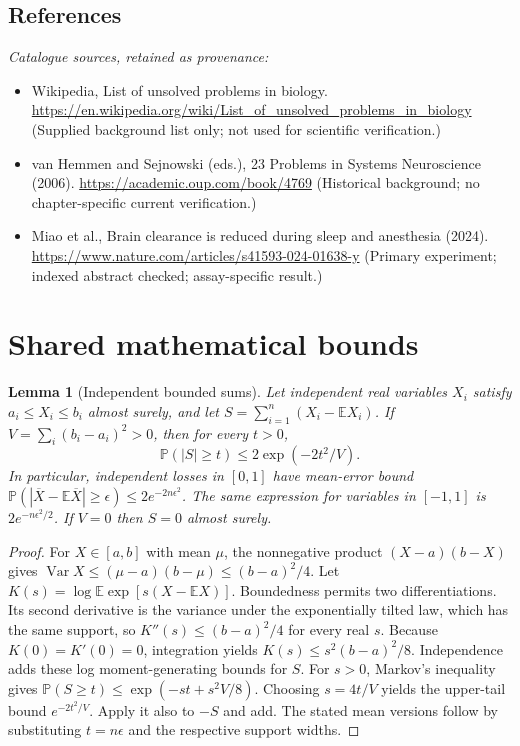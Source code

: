 \documentclass[11pt]{article}
\newcommand{\E}{\mathbb E}
\newcommand{\Prob}{\mathbb P}
\DeclareMathOperator{\Var}{Var}
\providecommand{\E}{\mathbb E}
\providecommand{\Prob}{\mathbb P}
\providecommand{\Var}{\operatorname{Var}}
\newtheorem{sharedlemma}{Lemma}[section]
\begin{document}
\subsection{References}
\noindent\emph{Catalogue sources, retained as provenance:}
\begin{itemize}
\item Wikipedia, List of unsolved problems in biology. \url{https://en.wikipedia.org/wiki/List_of_unsolved_problems_in_biology} (Supplied background list only; not used for scientific verification.)
\item van Hemmen and Sejnowski (eds.), 23 Problems in Systems Neuroscience (2006). \url{https://academic.oup.com/book/4769} (Historical background; no chapter-specific current verification.)
\item Miao et al., Brain clearance is reduced during sleep and anesthesia (2024). \url{https://www.nature.com/articles/s41593-024-01638-y} (Primary experiment; indexed abstract checked; assay-specific result.)
\end{itemize}
\clearpage


\appendix
\section{Shared mathematical bounds}\label{app:bounds}
\begin{sharedlemma}[Independent bounded sums]\label{lem:bounded}
Let independent real variables $X_i$ satisfy $a_i\leq X_i\leq b_i$ almost surely,
and let $S=\sum_{i=1}^n(X_i-\E X_i)$. If
$V=\sum_i(b_i-a_i)^2>0$, then for every $t>0$,
\[
 \Prob(|S|\geq t)\leq 2\exp(-2t^2/V).
\]
In particular, independent losses in $[0,1]$ have mean-error bound
$\Prob(|\overline X-\E\overline X|\geq\epsilon)
\leq2e^{-2n\epsilon^2}$. The same expression for variables in $[-1,1]$
is $2e^{-n\epsilon^2/2}$. If $V=0$ then $S=0$ almost surely.
\end{sharedlemma}
\begin{proof}
For $X\in[a,b]$ with mean $\mu$, the nonnegative product
$(X-a)(b-X)$ gives
$\Var X\leq(\mu-a)(b-\mu)\leq(b-a)^2/4$.
Let $K(s)=\log\E\exp[s(X-\E X)]$.
Boundedness permits two differentiations. Its second derivative is the variance
under the exponentially tilted law, which has the same support, so
$K''(s)\leq(b-a)^2/4$ for every real $s$.
Because $K(0)=K'(0)=0$, integration yields
$K(s)\leq s^2(b-a)^2/8$.
Independence adds these log moment-generating bounds for $S$.
For $s>0$, Markov's inequality gives
$\Prob(S\geq t)\leq\exp(-st+s^2V/8)$.
Choosing $s=4t/V$ yields the upper-tail bound $e^{-2t^2/V}$.
Apply it also to $-S$ and add. The stated mean versions follow by substituting
$t=n\epsilon$ and the respective support widths.
\end{proof}
\end{document}
